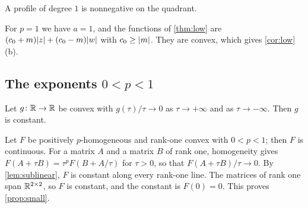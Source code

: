 \begin{lemma}\label{lem:pone}
A profile of degree $1$ is nonnegative on the quadrant.
\end{lemma}

For $p=1$ we have $a=1$, and the functions of \cref{thm:low} are
$(c_0+m)\lvert z\rvert+(c_0-m)\lvert w\rvert$ with $c_0\ge\lvert m\rvert$. They are convex, which gives
\cref{cor:low}\,(b).

\subsection{The exponents \texorpdfstring{$0<p<1$}{0 < p < 1}}

\begin{lemma}\label{lem:sublinear}
Let $g\colon\mathbb{R}\to\mathbb{R}$ be convex with $g(\tau)/\tau\to0$ as $\tau\to+\infty$ and as
$\tau\to-\infty$. Then $g$ is constant.
\end{lemma}

Let $F$ be positively $p$-homogeneous and rank-one convex with $0<p<1$; then $F$ is continuous.
For a matrix $A$ and a matrix $B$ of rank one, homogeneity gives
$F(A+\tau B)=\tau^pF(B+A/\tau)$ for $\tau>0$, so that $F(A+\tau B)/\tau\to0$. By
\cref{lem:sublinear}, $F$ is constant along every rank-one line. The matrices of rank one span
$\mathbb{R}^{2\times 2}$, so $F$ is constant, and the constant is $F(0)=0$. This proves \cref{prop:small}.
